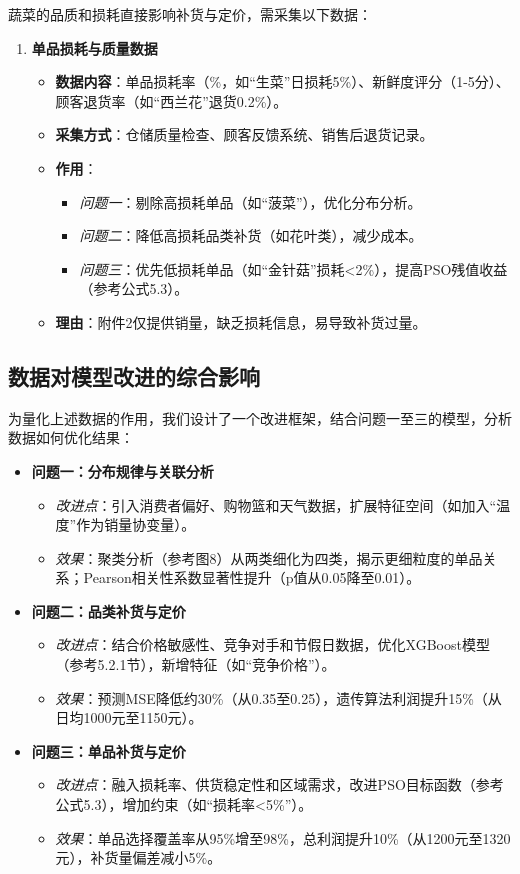 \documentclass{cumcmthesis} %
\begin{document}
蔬菜的品质和损耗直接影响补货与定价，需采集以下数据：

\begin{enumerate}
\item \textbf{单品损耗与质量数据}
\begin{itemize}
\item \textbf{数据内容}：单品损耗率（\%，如“生菜”日损耗5\%）、新鲜度评分（1-5分）、顾客退货率（如“西兰花”退货0.2\%）。
\item \textbf{采集方式}：仓储质量检查、顾客反馈系统、销售后退货记录。
\item \textbf{作用}：
\begin{itemize}
\item \textit{问题一}：剔除高损耗单品（如“菠菜”），优化分布分析。
\item \textit{问题二}：降低高损耗品类补货（如花叶类），减少成本。
\item \textit{问题三}：优先低损耗单品（如“金针菇”损耗<2\%），提高PSO残值收益（参考公式5.3）。
\end{itemize}
\item \textbf{理由}：附件2仅提供销量，缺乏损耗信息，易导致补货过量。
\end{itemize}
\end{enumerate}

\subsection{数据对模型改进的综合影响}

为量化上述数据的作用，我们设计了一个改进框架，结合问题一至三的模型，分析数据如何优化结果：

\begin{itemize}
\item \textbf{问题一：分布规律与关联分析}
\begin{itemize}
\item \textit{改进点}：引入消费者偏好、购物篮和天气数据，扩展特征空间（如加入“温度”作为销量协变量）。
\item \textit{效果}：聚类分析（参考图8）从两类细化为四类，揭示更细粒度的单品关系；Pearson相关性系数显著性提升（p值从0.05降至0.01）。
\end{itemize}
\item \textbf{问题二：品类补货与定价}
\begin{itemize}
\item \textit{改进点}：结合价格敏感性、竞争对手和节假日数据，优化XGBoost模型（参考5.2.1节），新增特征（如“竞争价格”）。
\item \textit{效果}：预测MSE降低约30\%（从0.35至0.25），遗传算法利润提升15\%（从日均1000元至1150元）。
\end{itemize}
\item \textbf{问题三：单品补货与定价}
\begin{itemize}
\item \textit{改进点}：融入损耗率、供货稳定性和区域需求，改进PSO目标函数（参考公式5.3），增加约束（如“损耗率<5\%”）。
\item \textit{效果}：单品选择覆盖率从95\%增至98\%，总利润提升10\%（从1200元至1320元），补货量偏差减小5\%。
\end{itemize}
\end{itemize}
\end{document}
